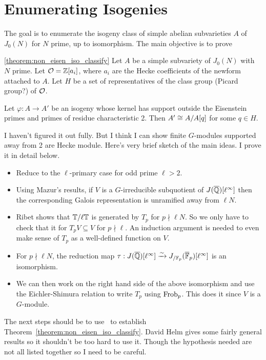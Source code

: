 \documentclass{article}
\begin{document}
\section{Enumerating Isogenies}

The goal is to enumerate the isogeny class of simple abelian subvarieties $A$
of $J_0(N)$ for $N$ prime, up to isomorphism. The main objective is to prove

\begin{theorem}\ref{theorem:non_eisen_iso_classify}
    Let $A$ be a simple subvariety of $J_0(N)$ with $N$ prime. Let
    $\mathcal{O}=\mathbb{Z}[a_i]$, where $a_i$ are the Hecke coefficients of the newform
    attached to $A$. Let $H$ be a set of representatives of the class group
    (Picard group?) of $\mathcal{O}$.

    Let $\varphi:A\to A'$ be an isogeny whose kernel has support outside the
    Eisenstein primes and primes of residue characteristic 2. Then $A'\cong
    A/A[q]$ for some $q\in H$.
\end{theorem}

I haven't figured it out fully. But I think I can show finite $G$-modules
supported away from 2 are Hecke module. Here's very brief sketch of the main
ideas. I prove it in detail below.
\begin{itemize}
    \item
        Reduce to the $\ell$-primary case for odd prime $\ell>2$.
    \item
        Using Mazur's results, if $V$ is a $G$-irreducible subquotient of
        $J(\overline{\mathbb{Q}})[\ell^\infty]$ then the corresponding Galois representation
        is unramified away from $\ell N$.
    \item
        Ribet shows that $\mathbb{T}/\ell \mathbb{T}$ is generated by $T_p$ for $p\nmid \ell
        N$. So we only have to check that it for $T_p V\subseteq V$ for
        $p\nmid \ell$. An induction argument is needed to even make sense of
        $T_p$ as a well-defined function on $V$.
    \item
        For $p\nmid \ell N$, the reduction map
        $\tau:J(\overline{\mathbb{Q}})[\ell^\infty]\xrightarrow{\sim} J_{/\mathbb{F}_p}(\overline{\mathbb{F}}_p)[\ell^\infty]$ is an
        isomorphism.
    \item
        We can then work on the right hand side of the above isomorphism and
        use the Eichler-Shimura relation to write $T_p$ using $\operatorname{Frob}_p$. This
        does it since $V$ is a $G$-module.
\end{itemize}

The next steps should be to use~\cite[Corollary 4.8]{MR2342491} to establish
Theorem~\ref{theorem:non_eisen_iso_classify}. David Helm gives some fairly
general results so it shouldn't be too hard to use it. Though the hypothesis
needed are not all listed together so I need to be careful.
\end{document}
